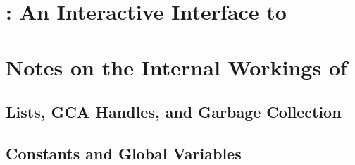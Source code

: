 \documentclass{report}
\begin{document}



\chapter{\isac: An Interactive Interface to \saclib}
\label{c:ISAC}




\chapter{Notes on the Internal Workings of \saclib}
\label{c:NIW}

\section{Lists, GCA Handles, and Garbage Collection}
\label{c:NIW s:GC}



\section{Constants and Global Variables}
\label{c:NIW s:CGV}




%
%


%
%

\clearpage
{}
\printindex
\end{document}
